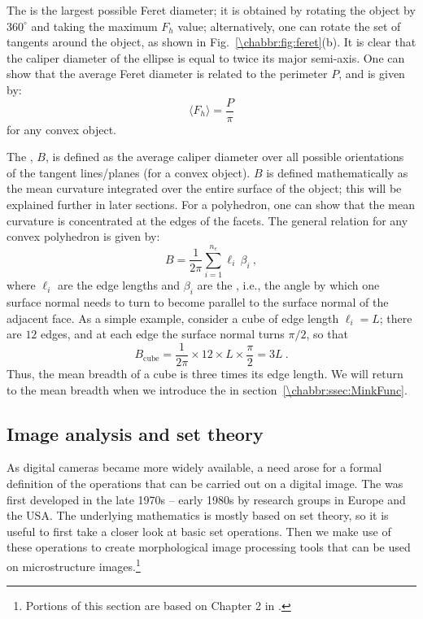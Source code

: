 The  is the largest possible Feret diameter; it is obtained by rotating the object by $360^{\circ}$ and taking the maximum $F_h$ value; alternatively, one can rotate the set of tangents around the object, as shown in Fig.~\ref{\chabbr:fig:feret}(b).  It is clear that the caliper diameter of the ellipse is equal to twice its major semi-axis.  One can show that the average Feret diameter is related to the perimeter $P$, and is given by:
\[
	\langle F_h\rangle = \frac{P}{\pi}
\]
for any convex object.

The , $B$, is defined as the average caliper diameter over all possible orientations of the tangent lines/planes (for a convex object). $B$ is defined mathematically as the mean curvature integrated over the entire surface of the object; this will be explained further in later sections.  For a polyhedron, one can show that the mean curvature is concentrated at the edges of the facets. The general relation for any convex polyhedron is given by:
\begin{equation}
	B = \frac{1}{2\pi}\sum_{i=1}^{n_e} \ell_i\,\beta_i\ ,\label{\chabbr:eq:meanbreadth}
\end{equation}
where $\ell_i$ are the edge lengths and $\beta_i$ are the , i.e., the angle by which one surface normal needs to turn to become parallel to the surface normal of the adjacent face.  As a simple example, consider a cube of edge length $\ell_i=L$; there are $12$ edges, and at each edge the surface normal turns $\pi/2$, so that 
\[
	B_{\text{cube}} = \frac{1}{2\pi}\times 12\times L\times \frac{\pi}{2}=3L\ .
\]
Thus, the mean breadth of a cube is three times its edge length.  We will return to the mean breadth when we introduce the  in section~\ref{\chabbr:ssec:MinkFunc}.

\subsection{Image analysis and set theory}
As digital cameras became more widely available, a need arose for a formal definition of the operations that can be carried out on a digital image. The  was first developed in the late 1970s -- early 1980s by research groups in Europe and the USA.  The underlying mathematics is mostly based on set theory, so it is useful to first take a closer look at basic set operations.  Then we make use of these operations to create morphological image processing tools that can be used on microstructure images.\footnote{Portions of this section are based on Chapter 2 in \cite{ohser2000a}.}

